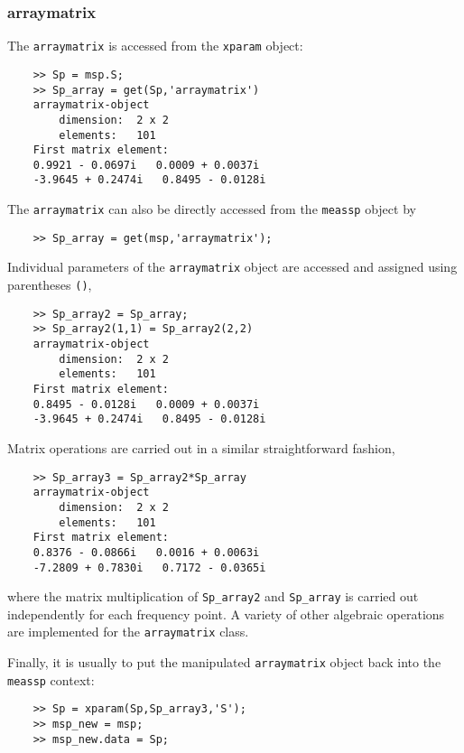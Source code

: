 \subsubsection{arraymatrix}
The \verb"arraymatrix" is accessed from the \verb"xparam" object:
\begin{small}
\begin{verbatim}
    >> Sp = msp.S;
    >> Sp_array = get(Sp,'arraymatrix')
    arraymatrix-object
        dimension:  2 x 2
        elements:   101
    First matrix element:
    0.9921 - 0.0697i   0.0009 + 0.0037i
    -3.9645 + 0.2474i   0.8495 - 0.0128i
\end{verbatim}
\end{small}
The \verb"arraymatrix" can also be directly accessed from the
\verb"meassp" object by
\begin{small}
\begin{verbatim}
    >> Sp_array = get(msp,'arraymatrix');
\end{verbatim}
\end{small}

Individual parameters of the \verb"arraymatrix" object are
accessed and assigned using parentheses \verb"()",
\begin{small}
\begin{verbatim}
    >> Sp_array2 = Sp_array;
    >> Sp_array2(1,1) = Sp_array2(2,2)
    arraymatrix-object
        dimension:  2 x 2
        elements:   101
    First matrix element:
    0.8495 - 0.0128i   0.0009 + 0.0037i
    -3.9645 + 0.2474i   0.8495 - 0.0128i
\end{verbatim}
\end{small}

Matrix operations are carried out in a similar straightforward fashion,
\begin{small}
\begin{verbatim}
    >> Sp_array3 = Sp_array2*Sp_array
    arraymatrix-object
        dimension:  2 x 2
        elements:   101
    First matrix element:
    0.8376 - 0.0866i   0.0016 + 0.0063i
    -7.2809 + 0.7830i   0.7172 - 0.0365i
\end{verbatim}
\end{small}
where the matrix multiplication of \verb"Sp_array2" and
\verb"Sp_array" is carried out independently for each frequency
point. A variety of other algebraic operations are implemented for
the \verb"arraymatrix" class.

Finally, it is usually to put the manipulated \verb"arraymatrix"
object back into the \verb"meassp" context:
\begin{small}
\begin{verbatim}
    >> Sp = xparam(Sp,Sp_array3,'S');
    >> msp_new = msp;
    >> msp_new.data = Sp;
\end{verbatim}
\end{small}

